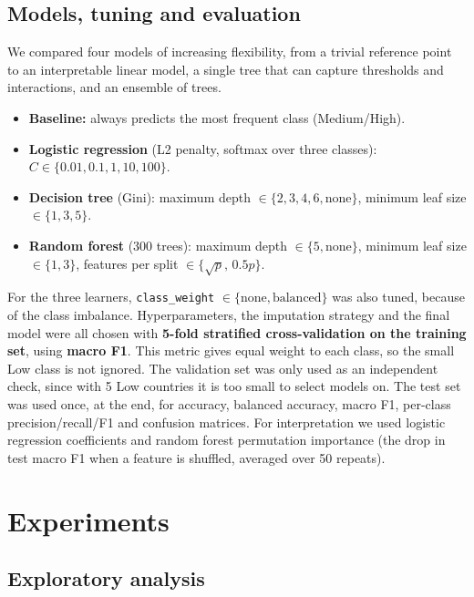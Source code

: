 \documentclass[10pt]{article}
\begin{document}
\subsection{Models, tuning and evaluation}

We compared four models of increasing flexibility, from a trivial reference point to an interpretable linear
model, a single tree that can capture thresholds and interactions, and an ensemble of trees.
\begin{itemize}
  \item \textbf{Baseline:} always predicts the most frequent class (Medium/High).
  \item \textbf{Logistic regression} (L2 penalty, softmax over three classes): $C\in\{0.01,0.1,1,10,100\}$.
  \item \textbf{Decision tree} (Gini): maximum depth $\in\{2,3,4,6,\text{none}\}$, minimum leaf size $\in\{1,3,5\}$.
  \item \textbf{Random forest} (300 trees): maximum depth $\in\{5,\text{none}\}$, minimum leaf size $\in\{1,3\}$,
  features per split $\in\{\sqrt{p},\,0.5p\}$.
\end{itemize}
For the three learners, \texttt{class\_weight} $\in\{\text{none},\text{balanced}\}$ was also tuned, because of
the class imbalance. Hyperparameters, the imputation strategy and the final model were all chosen with
\textbf{5-fold stratified cross-validation on the training set}, using \textbf{macro F1}. This metric gives equal
weight to each class, so the small Low class is not ignored. The validation set was only used as an independent
check, since with 5 Low countries it is too small to select models on. The test set was used once, at the end,
for accuracy, balanced accuracy, macro F1, per-class precision/recall/F1 and confusion matrices. For
interpretation we used logistic regression coefficients and random forest permutation importance (the drop in test
macro F1 when a feature is shuffled, averaged over 50 repeats).

\section{Experiments}

\subsection{Exploratory analysis}\label{sec:eda}
\end{document}

